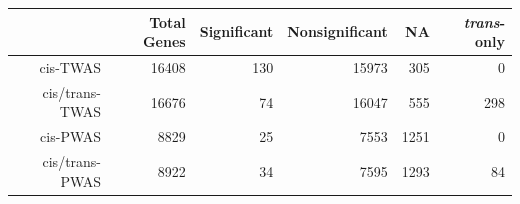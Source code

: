 \begin{table}[H]
\centering
\begingroup\footnotesize
\begin{tabular}{rrrrrr}
  \toprule
 & Total Genes & Significant & Nonsignificant & NA & \textit{trans}-only \\ 
  \midrule
cis-TWAS & 16408 & 130 & 15973 & 305 &   0 \\ 
  cis/trans-TWAS & 16676 &  74 & 16047 & 555 & 298 \\ 
  cis-PWAS & 8829 &  25 & 7553 & 1251 &   0 \\ 
  cis/trans-PWAS & 8922 &  34 & 7595 & 1293 &  84 \\ 
   \bottomrule
\end{tabular}
\endgroup
\end{table}
